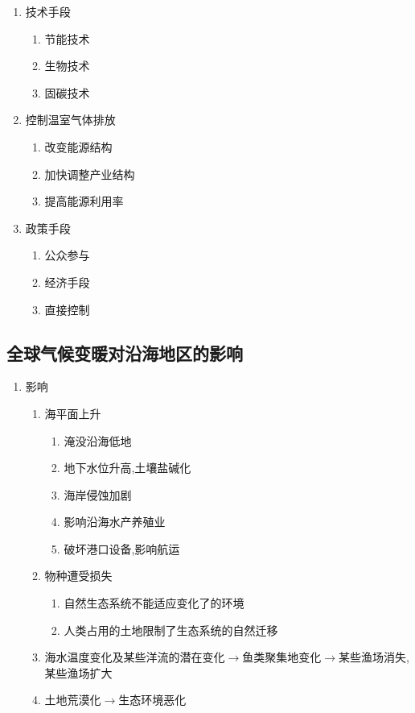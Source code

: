 \documentclass[a4paper]{article}
\begin{document}
\begin{enumerate}
\begin{enumerate}
\begin{enumerate}
            \end{enumerate}
            \item 技术手段
            \begin{enumerate}
                \item 节能技术
                \item 生物技术
                \item 固碳技术
            \end{enumerate}
            \item 控制温室气体排放
            \begin{enumerate}
                \item 改变能源结构
                \item 加快调整产业结构
                \item 提高能源利用率
            \end{enumerate}
            \item 政策手段
            \begin{enumerate}
                \item 公众参与
                \item 经济手段
                \item 直接控制
            \end{enumerate}
        \end{enumerate}
    \end{enumerate}
    \subsection{全球气候变暖对沿海地区的影响}
    \begin{enumerate}
        \item 影响
        \begin{enumerate}
            \item 海平面上升
            \begin{enumerate}
                \item 淹没沿海低地
                \item 地下水位升高,土壤盐碱化
                \item 海岸侵蚀加剧
                \item 影响沿海水产养殖业
                \item 破坏港口设备,影响航运
            \end{enumerate}
            \item 物种遭受损失
            \begin{enumerate}
                \item 自然生态系统不能适应变化了的环境
                \item 人类占用的土地限制了生态系统的自然迁移
            \end{enumerate}
            \item 海水温度变化及某些洋流的潜在变化$\rightarrow$鱼类聚集地变化$\rightarrow$某些渔场消失,某些渔场扩大 %
            \item 土地荒漠化$\rightarrow$生态环境恶化 %
        \end{enumerate}
    \end{enumerate}
\end{document}
